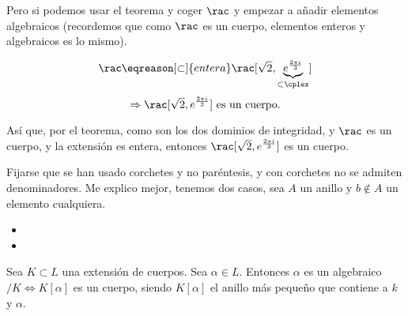 	\begin{example}[3]
		Pero si podemos usar el teorema y coger $\rac$ y empezar a añadir elementos algebraicos (recordemos que como $\rac$ es un cuerpo, elementos enteros y algebraicos es lo mismo).
		
		\[ \rac \eqreason[\subset]{entera} \rac[\sqrt{2}, \underbrace{e^{\frac{2\pi i}{3}}}_{\subset \cplex}] \]
		\[ \Rightarrow \rac[\sqrt{2}, e^{\frac{2\pi i}{3}}] \text{ es un cuerpo.}\]
		
		Así que, por el teorema, como son los dos dominios de integridad, y $\rac$ es un cuerpo, y la extensión es entera, entonces $\rac[\sqrt{2}, e^{\frac{2\pi i}{3}}]$ es un cuerpo.
	\end{example}
	
	\notacion Fijarse que se han usado corchetes y no paréntesis, y con corchetes no se admiten denominadores. Me explico mejor, tenemos dos casos, sea $A$ un anillo y $b\notin A$ un elemento cualquiera. \label{notacion: 1}
	\begin{itemize}
		\item
		\item
	\end{itemize}

	\begin{corol}\label{cor:1}
		Sea $K \subset L$ una extensión de cuerpos. Sea $\alpha \in L$. Entonces $\alpha$ es un algebraico$/K \Leftrightarrow K[\alpha]$ es un cuerpo, siendo $K[\alpha]$ el anillo más pequeño que contiene a $k$ y $\alpha$.
	\end{corol}

